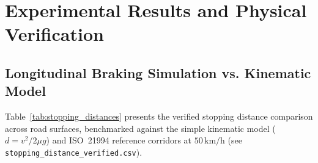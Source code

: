 \documentclass[3p,twocolumn]{elsarticle}
\begin{document}
\section{Experimental Results and Physical Verification}
\label{sec:results}

\subsection{Longitudinal Braking Simulation vs. Kinematic Model}
Table~\ref{tab:stopping_distances} presents the verified stopping distance comparison across road surfaces, benchmarked against the simple kinematic model ($d = v^2/2\mu g$) and ISO~21994 reference corridors at $50\,\text{km/h}$ (see \texttt{stopping\_distance\_}\allowbreak\texttt{verified.csv}).
\end{document}
